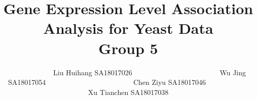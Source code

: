 
\title{
    Gene Expression Level Association Analysis for Yeast Data\\{\vspace{1em} \small Group 5}
}

\author{\name $\quad\quad\quad\quad\quad\quad$Liu Huihang   {\email SA18017026$\quad\quad\quad\quad\quad\quad$}
        \AND
        \name $\quad\quad\quad\quad\quad\quad$Wu Jing       {\email SA18017054$\quad\quad\quad\quad\quad\quad$}
        \AND
        \name $\quad\quad\quad\quad\quad\quad$Chen Ziyu     {\email SA18017046$\quad\quad\quad\quad\quad\quad$}
        \AND
        \name $\quad\quad\quad\quad\quad\quad$Xu Tianchen   {\email SA18017038$\quad\quad\quad\quad\quad\quad$}
}


\maketitle